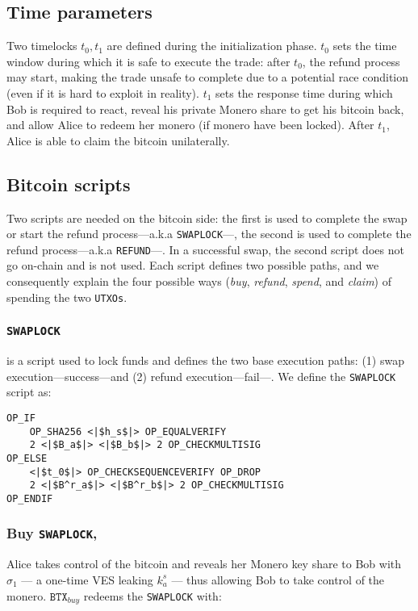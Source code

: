 \documentclass{llncs}
\newcommand{\BTX}{\texttt{BTX}}
\begin{document}
\subsection{Time parameters}
Two timelocks $t_0, t_1$ are defined during the initialization phase. $t_0$ sets the time window during which it is safe to execute the trade: after $t_0$, the refund process may start, making the trade unsafe to complete due to a potential race condition (even if it is hard to exploit in reality). $t_1$ sets the response time during which Bob is required to react, reveal his private Monero share to get his bitcoin back, and allow Alice to redeem her monero (if monero have been locked). After $t_1$, Alice is able to claim the bitcoin unilaterally.

\subsection{Bitcoin scripts}
Two scripts are needed on the bitcoin side: the first is used to complete the swap or start the refund process---a.k.a \texttt{SWAPLOCK}---, the second is used to complete the refund process---a.k.a \texttt{REFUND}---. In a successful swap, the second script does not go on-chain and is not used. Each script defines two possible paths, and we consequently explain the four possible ways (\textit{buy}, \textit{refund}, \textit{spend}, and \textit{claim}) of spending the two \texttt{UTXOs}.

\subsubsection{\texttt{SWAPLOCK}}
is a script used to lock funds and defines the two base execution paths: (1) swap execution---success---and (2) refund execution---fail---. We define the \texttt{SWAPLOCK} script as:

\begin{verbatim}
OP_IF
    OP_SHA256 <|$h_s$|> OP_EQUALVERIFY
    2 <|$B_a$|> <|$B_b$|> 2 OP_CHECKMULTISIG
OP_ELSE
    <|$t_0$|> OP_CHECKSEQUENCEVERIFY OP_DROP
    2 <|$B^r_a$|> <|$B^r_b$|> 2 OP_CHECKMULTISIG
OP_ENDIF
\end{verbatim}

\subsubsection{Buy \texttt{SWAPLOCK},}
Alice takes control of the bitcoin and reveals her Monero key share to Bob with $\sigma_1$ --- a one-time VES leaking $k^s_a$ --- thus allowing Bob to take control of the monero. $\BTX_\textit{buy}$ redeems the \texttt{SWAPLOCK} with:
\end{document}
